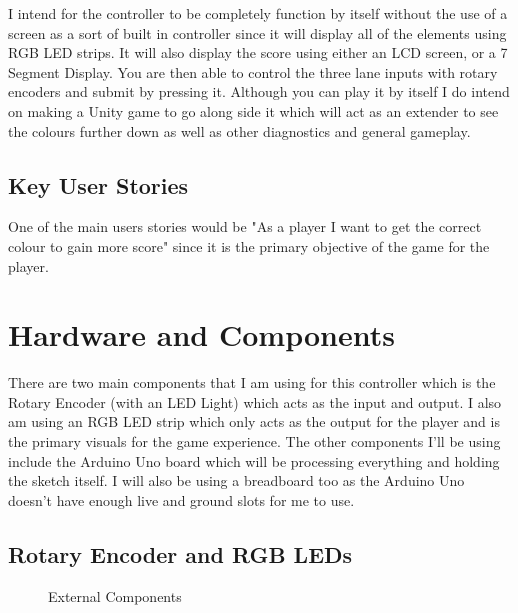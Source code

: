 \documentclass{article}
\begin{document}
I intend for the controller to be completely function by itself without the use of a screen as a sort of built in controller since it will display all of the elements using RGB LED strips. It will also display the score using either an LCD screen, or a 7 Segment Display. You are then able to control the three lane inputs with rotary encoders and submit by pressing it. Although you can play it by itself I do intend on making a Unity game to go along side it which will act as an extender to see the colours further down as well as other diagnostics and general gameplay.

\subsection{Key User Stories}

One of the main users stories would be "As a player I want to get the correct colour to gain more score" since it is the primary objective of the game for the player.

\section{Hardware and Components}

There are two main components that I am using for this controller which is the Rotary Encoder (with an LED Light) which acts as the input and output. I also am using an RGB LED strip which only acts as the output for the player and is the primary visuals for the game experience. The other components I'll be using include the Arduino Uno board which will be processing everything and holding the sketch itself. I will also be using a breadboard too as the Arduino Uno doesn't have enough live and ground slots for me to use.

\subsection{Rotary Encoder and RGB LEDs}

\begin{figure}[ht]%
    \centering
    \qquad
    \caption{External Components}%
    \label{fig:external_component}%
\end{figure}
\end{document}
